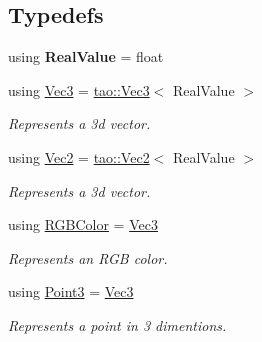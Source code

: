 \subsection*{Typedefs}
\begin{DoxyCompactItemize}
\item 
\mbox{\label{namespaceomg_ae1f923770ca854087fb3542f132ea030}} 
using {\bfseries Real\+Value} = float
\item 
\mbox{\label{namespaceomg_a45a9482677fee9933ff369b49894e316}} 
using \mbox{\hyperlink{namespaceomg_a45a9482677fee9933ff369b49894e316}{Vec3}} = \mbox{\hyperlink{namespacetao_ae482eac12cddc119b58d00c3cd25473e}{tao\+::\+Vec3}}$<$ Real\+Value $>$
\begin{DoxyCompactList}\small\item\em Represents a 3d vector. \end{DoxyCompactList}\item 
\mbox{\label{namespaceomg_aefe4804ccbaed61b5dd699b449b31150}} 
using \mbox{\hyperlink{namespaceomg_aefe4804ccbaed61b5dd699b449b31150}{Vec2}} = \mbox{\hyperlink{namespacetao_a7c689316b82c94e7228f42ac874a548b}{tao\+::\+Vec2}}$<$ Real\+Value $>$
\begin{DoxyCompactList}\small\item\em Represents a 3d vector. \end{DoxyCompactList}\item 
\mbox{\label{namespaceomg_a7b0e3f3dcf76f2b4758c314a41885917}} 
using \mbox{\hyperlink{namespaceomg_a7b0e3f3dcf76f2b4758c314a41885917}{R\+G\+B\+Color}} = \mbox{\hyperlink{namespaceomg_a45a9482677fee9933ff369b49894e316}{Vec3}}
\begin{DoxyCompactList}\small\item\em Represents an R\+GB color. \end{DoxyCompactList}\item 
\mbox{\label{namespaceomg_af85242d35fdacf829d32a6f9b95f3e35}} 
using \mbox{\hyperlink{namespaceomg_af85242d35fdacf829d32a6f9b95f3e35}{Point3}} = \mbox{\hyperlink{namespaceomg_a45a9482677fee9933ff369b49894e316}{Vec3}}
\begin{DoxyCompactList}\small\item\em Represents a point in 3 dimentions. \end{DoxyCompactList}\item 

\end{DoxyCompactItemize}
